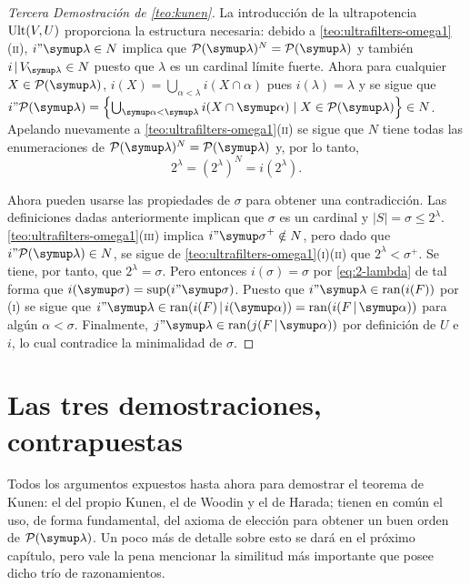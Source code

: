 \begin{proof}[Tercera Demostración de \ref{teo:kunen}]
    La introducción de la ultrapotencia $\operatorname{Ult}(V, U)$ proporciona la estructura necesaria:
    debido a \ref{teo:ultrafilters-omega1}(\textsc{ii}), $i"\lambda\in N$ implica que
    $\pwset{\lambda}^N = \pwset{\lambda}$ y también $i\rest V_\lambda\in N$ puesto que
    $\lambda$ es un cardinal límite fuerte. Ahora para cualquier $X\in\pwset{\lambda}$,
    $i(X) = \bigcup_{\alpha<\lambda} i(X\cap\alpha)$ pues $i(\lambda)=\lambda$ y se sigue
    que $i"\pwset{\lambda} = \set{\bigcup_{\alpha<\lambda} i(X\cap\alpha)\mid
    X\in\pwset{\lambda}}\in N$. Apelando nuevamente a \ref{teo:ultrafilters-omega1}(\textsc{ii})
    se sigue que $N$ tiene todas las enumeraciones de $\pwset{\lambda}^N=\pwset{\lambda}$ y,
    por lo tanto,
    \begin{equation}\label{eq:2-lambda}
        2^\lambda = (2^\lambda)^N = i(2^\lambda).
    \end{equation}

    Ahora pueden usarse las propiedades de $\sigma$ para obtener una contradicción.
    Las definiciones dadas anteriormente implican que $\sigma$ es un cardinal y
    $|S|=\sigma\leq 2^\lambda$. \ref{teo:ultrafilters-omega1}(\textsc{iii}) implica
    $i"\sigma^+\notin N$, pero dado que $i"\pwset{\lambda}\in N$, se sigue de
    \ref{teo:ultrafilters-omega1}(\textsc{i})(\textsc{ii}) que $2^\lambda<\sigma^+$.
    Se tiene, por tanto, que $2^\lambda = \sigma$. Pero entonces
    $i(\sigma)=\sigma$ por \ref{eq:2-lambda} de tal forma que $i(\sigma)=\sup(i"\sigma)$.
    Puesto que $i"\lambda\in\ran(i(F))$ por (\textsc{i})
    se sigue que $i"\lambda\in\ran(i(F)\rest i(\alpha)) = \ran(i(F\rest\alpha))$ para algún
    $\alpha<\sigma$. Finalmente, $j"\lambda\in\ran(j(F\rest\alpha))$ por definición de $U$
    e $i$, lo cual contradice la minimalidad de $\sigma$.
\end{proof}

\section{Las tres demostraciones, contrapuestas}

Todos los argumentos expuestos hasta ahora para demostrar el teorema de Kunen:
el del propio Kunen, el de Woodin y el de Harada; tienen en común el uso,
de forma fundamental, del axioma de elección para obtener un buen orden
de $\pwset{\lambda}$. Un poco más de detalle sobre esto se dará en el próximo
capítulo, pero vale la pena mencionar la similitud más importante
que posee dicho trío de razonamientos.

